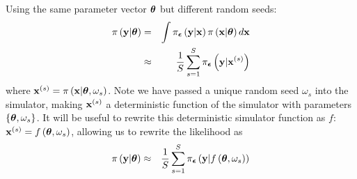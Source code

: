 \documentclass[]{article}
\begin{document}
Using the same parameter vector ${\bm \theta}$ but different random seeds:
\begin{eqnarray}
  \pi\left( {\bf y} | {\bm \theta} \right) & = &  \int \pi_{{\bm {\epsilon}}}\left( {\bf y} | {\bf x} \right) \pi\left( {\bf x} | {\bm \theta} \right) d {\bf x} \\
   & \approx & \frac{1}{S} \sum_{s=1}^S \pi_{{\bm {\epsilon}}}\left( {\bf y} | {\bf x}^{(s)} \right)
\end{eqnarray}
where ${\bf x}^{(s)} = \pi\left( {\bf x} | {\bm \theta}, \omega_s \right)$.  Note we have passed a unique random seed $\omega_s$ into the simulator, making ${\bf x}^{(s)}$ a deterministic function of the simulator with parameters $\{{\bm \theta}, \omega_s\}$.  It will be useful to rewrite this deterministic simulator function as $f$: ${\bf x}^{(s)} = f\left( {\bm \theta}, \omega_s \right)$, allowing us to rewrite the likelihood as
\begin{eqnarray}
  \pi\left( {\bf y} | {\bm \theta} \right) & \approx & \frac{1}{S} \sum_{s=1}^S \pi_{{\bm {\epsilon}}}\left( {\bf y} | f\left( {\bm \theta}, \omega_s \right) \right)
\end{eqnarray}
\end{document}
